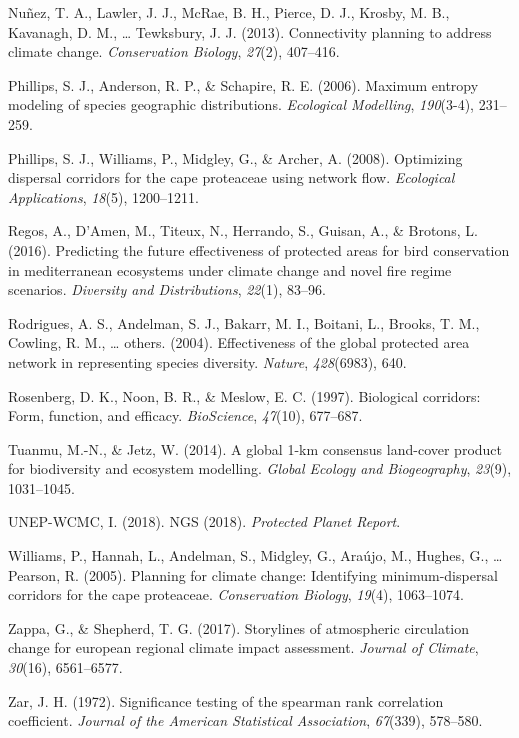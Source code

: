 \documentclass[]{article}
\begin{document}
\leavevmode\hypertarget{ref-nunez2013connectivity}{}%
Nuñez, T. A., Lawler, J. J., McRae, B. H., Pierce, D. J., Krosby, M. B., Kavanagh, D. M., \ldots{} Tewksbury, J. J. (2013). Connectivity planning to address climate change. \emph{Conservation Biology}, \emph{27}(2), 407--416.

\leavevmode\hypertarget{ref-phillips2006maximum}{}%
Phillips, S. J., Anderson, R. P., \& Schapire, R. E. (2006). Maximum entropy modeling of species geographic distributions. \emph{Ecological Modelling}, \emph{190}(3-4), 231--259.

\leavevmode\hypertarget{ref-phillips2008optimizing}{}%
Phillips, S. J., Williams, P., Midgley, G., \& Archer, A. (2008). Optimizing dispersal corridors for the cape proteaceae using network flow. \emph{Ecological Applications}, \emph{18}(5), 1200--1211.

\leavevmode\hypertarget{ref-regos2016predicting}{}%
Regos, A., D'Amen, M., Titeux, N., Herrando, S., Guisan, A., \& Brotons, L. (2016). Predicting the future effectiveness of protected areas for bird conservation in mediterranean ecosystems under climate change and novel fire regime scenarios. \emph{Diversity and Distributions}, \emph{22}(1), 83--96.

\leavevmode\hypertarget{ref-rodrigues2004effectiveness}{}%
Rodrigues, A. S., Andelman, S. J., Bakarr, M. I., Boitani, L., Brooks, T. M., Cowling, R. M., \ldots{} others. (2004). Effectiveness of the global protected area network in representing species diversity. \emph{Nature}, \emph{428}(6983), 640.

\leavevmode\hypertarget{ref-rosenberg1997biological}{}%
Rosenberg, D. K., Noon, B. R., \& Meslow, E. C. (1997). Biological corridors: Form, function, and efficacy. \emph{BioScience}, \emph{47}(10), 677--687.

\leavevmode\hypertarget{ref-tuanmu2014global}{}%
Tuanmu, M.-N., \& Jetz, W. (2014). A global 1-km consensus land-cover product for biodiversity and ecosystem modelling. \emph{Global Ecology and Biogeography}, \emph{23}(9), 1031--1045.

\leavevmode\hypertarget{ref-unep2018ngs}{}%
UNEP-WCMC, I. (2018). NGS (2018). \emph{Protected Planet Report}.

\leavevmode\hypertarget{ref-williams2005planning}{}%
Williams, P., Hannah, L., Andelman, S., Midgley, G., Araújo, M., Hughes, G., \ldots{} Pearson, R. (2005). Planning for climate change: Identifying minimum-dispersal corridors for the cape proteaceae. \emph{Conservation Biology}, \emph{19}(4), 1063--1074.

\leavevmode\hypertarget{ref-zappa2017storylines}{}%
Zappa, G., \& Shepherd, T. G. (2017). Storylines of atmospheric circulation change for european regional climate impact assessment. \emph{Journal of Climate}, \emph{30}(16), 6561--6577.

\leavevmode\hypertarget{ref-zar1972significance}{}%
Zar, J. H. (1972). Significance testing of the spearman rank correlation coefficient. \emph{Journal of the American Statistical Association}, \emph{67}(339), 578--580.
\end{document}

